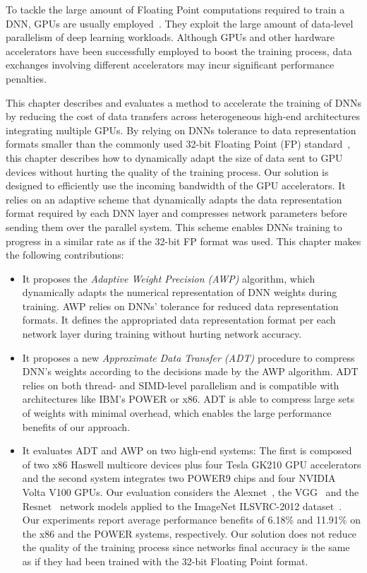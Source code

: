 To tackle the large amount of Floating Point computations required to train a DNN, GPUs are usually employed~\cite{You17}. 
They exploit the large amount of data-level parallelism of deep learning workloads. 
Although GPUs and other hardware accelerators have been successfully employed to 
boost the training process, data exchanges involving different accelerators may incur 
significant performance penalties. 

This chapter describes and evaluates a method to accelerate the training of DNNs by reducing the cost 
of data transfers across heterogeneous high-end architectures integrating 
multiple GPUs. By relying on DNNs 
tolerance to data representation formats smaller than the commonly used 32-bit Floating Point (FP) standard~\cite{gupta15, flexpoint17}, this chapter describes how to 
dynamically adapt the size of data sent to GPU devices without 
hurting the quality of the training process. 
Our solution is designed to efficiently use the incoming bandwidth of the GPU accelerators.
It relies on an adaptive scheme that dynamically adapts the data representation format required 
by each DNN layer and compresses network parameters before sending them over the parallel system.
This scheme enables DNNs training to progress in a similar rate as if the 32-bit FP format was used.
This chapter makes the following contributions:

\begin{itemize}

\item It proposes the {\it Adaptive Weight Precision (AWP)} algorithm, which 
dynamically adapts the numerical representation of DNN weights during training. 
AWP relies on DNNs' tolerance for reduced data representation formats.  
It defines the appropriated data representation format per each network layer during  
training without hurting network accuracy.

\item It proposes a new {\it Approximate Data Transfer (ADT)} procedure to compress 
DNN's weights according to the decisions made by the AWP algorithm. 
ADT relies on both thread- and SIMD-level parallelism  
and is compatible with architectures like IBM's POWER 
or x86. ADT is able to compress large 
sets of weights with minimal overhead, which enables the large performance benefits of our approach.

\item It evaluates ADT and AWP on 
two high-end systems: The first is composed of two x86 Haswell multicore 
devices plus four Tesla GK210 GPU accelerators and the second system integrates two POWER9 chips and four NVIDIA Volta V100 GPUs. 
Our evaluation considers the Alexnet~\cite{alexnet}, the VGG~\cite{vgg} and the Resnet~\cite{resnet} network models applied to 
the ImageNet ILSVRC-2012 dataset~\cite{imagenet}.
Our experiments report average performance benefits of 6.18\% and 11.91\% on the x86 and the POWER systems, respectively.
Our solution does not reduce the quality of the training process since networks final accuracy is the same as if they had been trained with the 32-bit Floating Point format.
\end{itemize}

